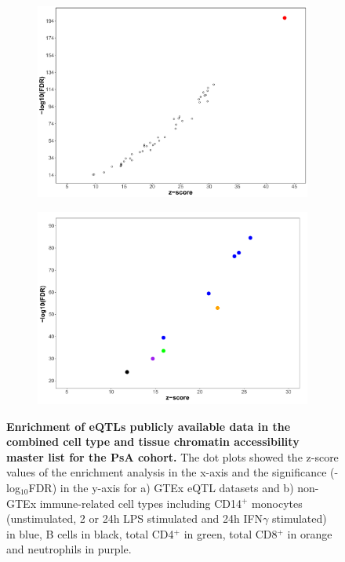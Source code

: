 \bigskip
\begin{figure}[H]
\centering
\begin{subfigure}[b]{0.5\textwidth}
\centering 
\includegraphics[width=\textwidth]{./Results3/pdfs/ATAC_PSA_all_GTeX_eQTL_enrichment_dotplot}
\caption{}
\end{subfigure}
\begin{subfigure}[b]{0.5\textwidth} 
\centering
\includegraphics[width=\textwidth]{./Results3/pdfs/ATAC_PSA_all_Jknight_eQTL_enrichment_dotplot}
\caption{}
\end{subfigure}
\caption[Enrichment of eQTLs publicly available data in the combined cell type and tissue chromatin accessibility master list for the PsA cohort.]{\textbf{Enrichment of eQTLs publicly available data in the combined cell type and tissue chromatin accessibility master list for the PsA cohort.} The dot plots showed the z-score values of the enrichment analysis in the x-axis and the significance (-log$_10$FDR) in the y-axis for a) GTEx eQTL datasets and b) non-GTEx immune-related cell types including CD14$^+$ monocytes (unstimulated, 2 or 24h LPS stimulated and 24h IFN$\gamma$ stimulated) in blue, B cells in black, total CD4$^+$ in green, total CD8$^+$ in orange and neutrophils in purple.}
\label{figure:PsA_FAST_ATAC_eQTL_enrichment}
\end{figure}





